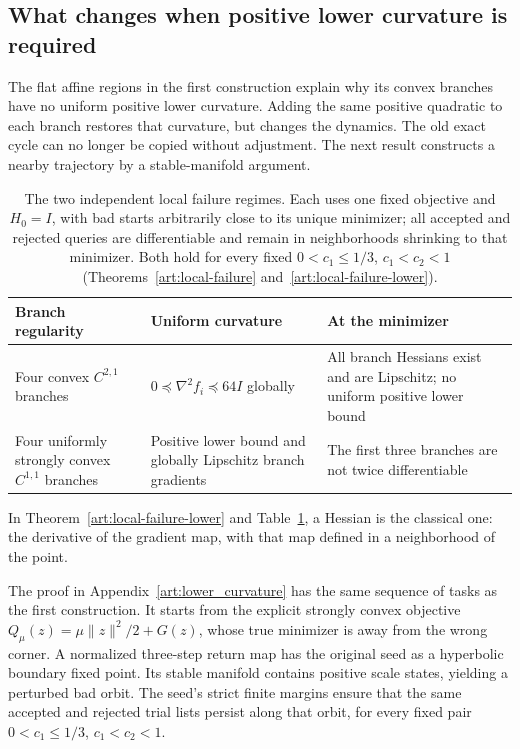 \subsection{What changes when positive lower curvature is required}
The flat affine regions in the first construction explain why its convex
branches have no uniform positive lower curvature. Adding the same positive
quadratic to each branch restores that curvature, but changes the dynamics.
The old exact cycle can no longer be copied without adjustment. The next result constructs
a nearby trajectory by a stable-manifold argument.
\par\medskip
\noindent\begin{minipage}{\textwidth}\setlength{\parindent}{15pt}

\end{minipage}
\par\medskip


\begin{table}[t]
\centering
\begin{tabular}{>{\raggedright\arraybackslash}p{}>{\raggedright\arraybackslash}p{}>{\raggedright\arraybackslash}p{}}
\toprule
Branch regularity & Uniform curvature & At the minimizer\\
\midrule
Four convex $C^{2,1}$ branches
& $0\preceq\nabla^2f_i\preceq64I$ globally
& All branch Hessians exist and are Lipschitz; no uniform positive lower bound\\[3pt]
Four uniformly strongly convex $C^{1,1}$ branches
& Positive lower bound and globally Lipschitz branch gradients
& The first three branches are not twice differentiable\\
\bottomrule
\end{tabular}
\caption{The two independent local failure regimes. Each uses one fixed
objective and $H_0=I$, with bad starts arbitrarily close to its unique
minimizer; all accepted and rejected queries are differentiable
and remain in neighborhoods shrinking to that minimizer. Both hold for
every fixed $0<c_1\le1/3$, $c_1<c_2<1$
(Theorems~\ref{art:local-failure} and~\ref{art:local-failure-lower}).}
\label{art:regularity-map}
\end{table}

In Theorem~\ref{art:local-failure-lower} and Table~\ref{art:regularity-map}, a
Hessian is the classical one: the derivative of the gradient map, with that
map defined in a neighborhood of the point.

The proof in Appendix~\ref{art:lower_curvature} has the same sequence of
tasks as the first construction. It starts from the explicit strongly convex
objective $Q_\mu(z)=\mu\|z\|^2/2+G(z)$, whose true minimizer is away from
the wrong corner. A normalized three-step return map has the original seed
as a hyperbolic boundary fixed point. Its stable manifold contains positive
scale states, yielding a perturbed bad orbit. The seed's strict
finite margins ensure that the same accepted and rejected trial lists
persist along that orbit, for every fixed pair $0<c_1\le1/3$, $c_1<c_2<1$.

